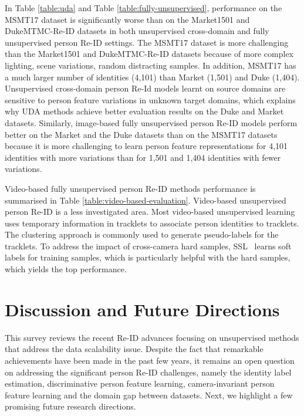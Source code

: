 \documentclass[a4paper,fleqn]{cas-dc}
\begin{document}
In Table \ref{table:uda} and Table \ref{table:fully-unsupervised}, performance on the MSMT17 dataset is significantly worse than on the Market1501 and DukeMTMC-Re-ID datasets in both unsupervised cross-domain and fully unsupervised person Re-ID settings. The MSMT17 dataset is more challenging than the Market1501 and DukeMTMC-Re-ID datasets because of more complex lighting, scene variations, random distracting samples. In addition, MSMT17 has a much larger number of identities (4,101) than Market (1,501) and Duke (1,404). Unsupervised cross-domain person Re-Id models learnt on source domains are sensitive to person feature variations in unknown target domains, which explains why UDA methods achieve better evaluation results on the Duke and Market datasets. Similarly, image-based fully unsupervised person Re-ID models perform better on the Market and the Duke datasets than on the MSMT17 datasets because it is more challenging to learn person feature representations for 4,101 identities with more variations than for 1,501 and 1,404 identities with fewer variations.

Video-based fully unsupervised person Re-ID methods performance is summarised in Table \ref{table:video-based-evaluation}. Video-based unsupervised person Re-ID is a less investigated area. Most video-based unsupervised learning uses temporary information in tracklets to associate person identities to tracklets. The clustering approach is commonly used to generate pseudo-labels for the tracklets. To address the impact of cross-camera hard samples, SSL~\cite{lin_unsupervised_2020} learns soft labels for training samples, which is particularly helpful with the hard samples, which yields the top performance.

\section{Discussion and Future Directions}\label{future}
This survey reviews the recent Re-ID advances focusing on unsupervised methods that address the data scalability issue. Despite the fact that remarkable achievements have been made in the past few years, it remains an open question on addressing the significant person Re-ID challenges, namely the identity label estimation, discriminative person feature learning, camera-invariant person feature learning and the domain gap between datasets. Next, we highlight a few promising future research directions.
\end{document}
